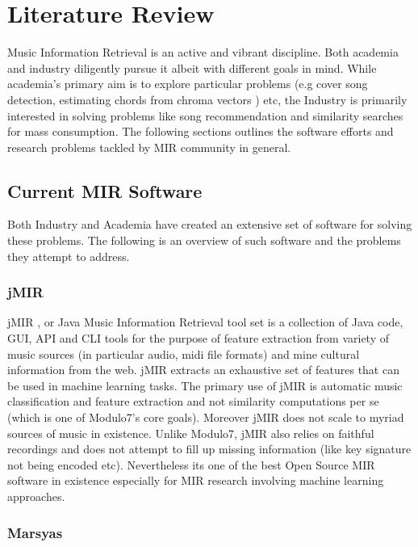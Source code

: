 \chapter{Literature Review}

\noindent Music Information Retrieval is an active and vibrant discipline. Both academia and industry diligently pursue it albeit with different goals in mind. While academia's primary aim is to explore particular problems (e.g cover song detection, estimating chords from chroma vectors \cite{chord-detection} ) etc, the Industry is primarily interested in solving problems like song recommendation and similarity searches for mass consumption. The following sections outlines the software efforts and research problems tackled by MIR community in general. 

\section{Current MIR Software}
\noindent Both Industry and Academia have created an extensive set of software for solving these problems. The following is an overview of such software and the problems they attempt to address.

\subsection{jMIR}

\noindent jMIR  \cite{jMIR}, or Java Music Information Retrieval tool set is a collection of Java code, GUI, API and CLI tools for the purpose of feature extraction from variety of music sources (in particular audio, midi file formats) and mine cultural information from the web. jMIR extracts an exhaustive set of features that can be used in machine learning tasks. The primary use of jMIR is automatic music classification and feature extraction and not similarity computations per se (which is one of Modulo7's core goals). Moreover jMIR does not scale to myriad sources of music in existence. Unlike Modulo7, jMIR also relies on faithful recordings and does not attempt to fill up missing information (like key signature not being encoded etc). Nevertheless its one of the best Open Source MIR software in existence especially for MIR research involving machine learning approaches. 

\subsection{Marsyas}

